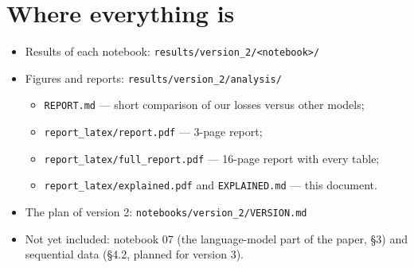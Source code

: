 \documentclass[11pt]{article}
\begin{document}
\section{Where everything is}
\begin{itemize}
  \item Results of each notebook: \texttt{results/version\_2/<notebook>/}
  \item Figures and reports: \texttt{results/version\_2/analysis/}
        \begin{itemize}
          \item \texttt{REPORT.md} --- short comparison of our losses versus other models;
          \item \texttt{report\_latex/report.pdf} --- 3-page report;
          \item \texttt{report\_latex/full\_report.pdf} --- 16-page report with every table;
          \item \texttt{report\_latex/explained.pdf} and \texttt{EXPLAINED.md} --- this document.
        \end{itemize}
  \item The plan of version 2: \texttt{notebooks/version\_2/VERSION.md}
  \item Not yet included: notebook 07 (the language-model part of the paper, \S3) and sequential data
        (\S4.2, planned for version 3).
\end{itemize}
\end{document}
